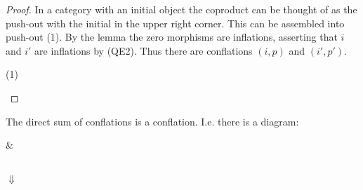    \begin{proof}
        In a category with an initial object the coproduct can be thought of as the push-out with the initial in the upper right corner. This can be assembled into push-out (1).
        By the lemma the zero morphisms are inflations, asserting that $i$ and $i'$ are inflations by (QE2). Thus there are conflations $(i,p)$ and $(i',p')$.

        \begin{center}
            (1)
        \end{center}
    \end{proof}

    \begin{corollary}
        The direct sum of conflations is a conflation. I.e. there is a diagram:
        \begin{center}
             \&
             \\
            $\Downarrow$ \\
        \end{center}
    \end{corollary}

